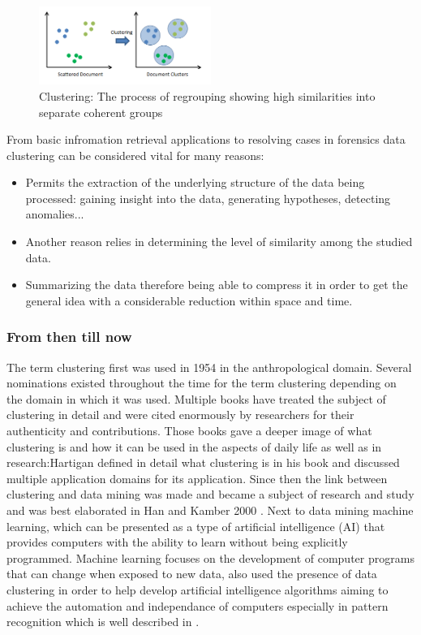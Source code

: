 \documentclass[]{article}
\begin{document}
\begin{figure}[h!]
	\centering
	\includegraphics[width=0.5\textwidth]{clustering.png}
	\caption{Clustering: The process of regrouping showing high similarities into separate coherent groups}
\end{figure} 

From basic infromation retrieval applications to resolving cases in forensics data clustering can be considered vital for many reasons:

\begin{itemize}
	\item Permits the extraction of the underlying structure of the data being processed: gaining insight into the data, generating hypotheses, detecting anomalies...
	\item Another reason relies in determining the level of similarity among the studied data.
	\item Summarizing the data therefore being able to compress it in order to get the general idea with a considerable reduction within space and time.
\end{itemize}
\subsubsection{From then till now}
The term clustering first was used in 1954 in the anthropological domain. Several nominations existed throughout the time for the term clustering depending on the domain in which it was used\cite{jain1988algorithms}. Multiple books have treated the subject of clustering in detail and were cited enormously by researchers for their authenticity and contributions. Those books gave a deeper image of what clustering is and how it can be used in the aspects of daily life as well as in research:Hartigan \cite{hartigan1975clustering} defined in detail what clustering is in his book and discussed multiple application domains for its application. Since then the link between clustering and data mining was made and became a subject of research and study and was best elaborated in Han and Kamber 2000 \cite{han2000data}. Next to data mining machine learning, which can be presented as a type of artificial intelligence (AI) that provides computers with the ability to learn without being explicitly programmed. Machine learning focuses on the development of computer programs that can change when exposed to new data, also used the presence of data clustering in order to help develop artificial intelligence algorithms aiming to achieve the automation and independance of computers especially in pattern recognition which is well described in \cite{bishop2006pattern}. 
\end{document}
